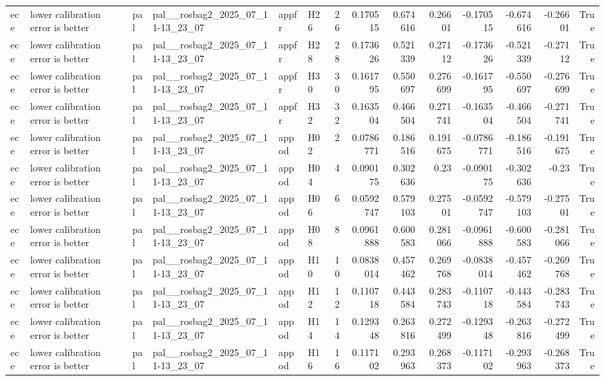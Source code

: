 \begin{longtable}{llllllrrrrrrrr}
ece & lower calibration error is better & pal & pal\_\_rosbag2\_2025\_07\_11-13\_23\_07 & appfr & H26 & 26 & 0.170515 & 0.674616 & 0.26601 & -0.170515 & -0.674616 & -0.26601 & True \\
ece & lower calibration error is better & pal & pal\_\_rosbag2\_2025\_07\_11-13\_23\_07 & appfr & H28 & 28 & 0.173626 & 0.521339 & 0.27112 & -0.173626 & -0.521339 & -0.27112 & True \\
ece & lower calibration error is better & pal & pal\_\_rosbag2\_2025\_07\_11-13\_23\_07 & appfr & H30 & 30 & 0.161795 & 0.550697 & 0.276699 & -0.161795 & -0.550697 & -0.276699 & True \\
ece & lower calibration error is better & pal & pal\_\_rosbag2\_2025\_07\_11-13\_23\_07 & appfr & H32 & 32 & 0.163504 & 0.466504 & 0.271741 & -0.163504 & -0.466504 & -0.271741 & True \\
ece & lower calibration error is better & pal & pal\_\_rosbag2\_2025\_07\_11-13\_23\_07 & appod & H02 & 2 & 0.0786771 & 0.186516 & 0.191675 & -0.0786771 & -0.186516 & -0.191675 & True \\
ece & lower calibration error is better & pal & pal\_\_rosbag2\_2025\_07\_11-13\_23\_07 & appod & H04 & 4 & 0.090175 & 0.302636 & 0.23 & -0.090175 & -0.302636 & -0.23 & True \\
ece & lower calibration error is better & pal & pal\_\_rosbag2\_2025\_07\_11-13\_23\_07 & appod & H06 & 6 & 0.0592747 & 0.579103 & 0.27501 & -0.0592747 & -0.579103 & -0.27501 & True \\
ece & lower calibration error is better & pal & pal\_\_rosbag2\_2025\_07\_11-13\_23\_07 & appod & H08 & 8 & 0.0961888 & 0.600583 & 0.281066 & -0.0961888 & -0.600583 & -0.281066 & True \\
ece & lower calibration error is better & pal & pal\_\_rosbag2\_2025\_07\_11-13\_23\_07 & appod & H10 & 10 & 0.0838014 & 0.457462 & 0.269768 & -0.0838014 & -0.457462 & -0.269768 & True \\
ece & lower calibration error is better & pal & pal\_\_rosbag2\_2025\_07\_11-13\_23\_07 & appod & H12 & 12 & 0.110718 & 0.443584 & 0.283743 & -0.110718 & -0.443584 & -0.283743 & True \\
ece & lower calibration error is better & pal & pal\_\_rosbag2\_2025\_07\_11-13\_23\_07 & appod & H14 & 14 & 0.129348 & 0.263816 & 0.272499 & -0.129348 & -0.263816 & -0.272499 & True \\
ece & lower calibration error is better & pal & pal\_\_rosbag2\_2025\_07\_11-13\_23\_07 & appod & H16 & 16 & 0.117102 & 0.293963 & 0.268373 & -0.117102 & -0.293963 & -0.268373 & True \\

\end{longtable}

